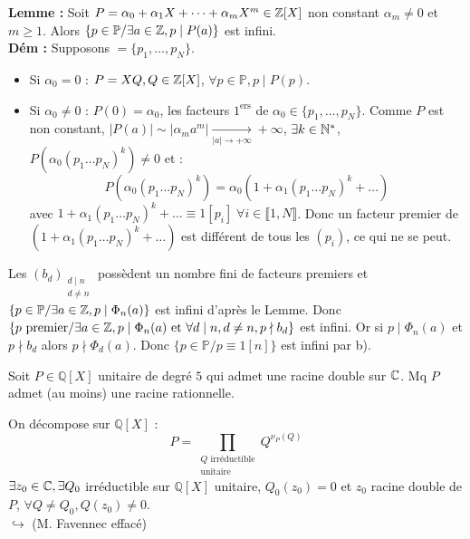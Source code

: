 \begin{solution}
\textbf{Lemme :} Soit $P = \alpha_0 + \alpha_1 X + \dots + \alpha_m X^m \in \mathbb Z[X]$ non constant $\alpha_m \neq 0$ et $m \geq 1$. Alors $\{p \in \mathbb{P} / \exists a \in \mathbb Z, p \mid P(a)\}$ est infini. \\
\textbf{Dém :} Supposons $= \{p_1, \dots, p_N\}$.
\begin{itemize}
  \item Si $\alpha_0 = 0$ : $P = X Q, Q \in \mathbb Z[X]$, $\forall p \in \mathbb{P}, p \mid P(p)$.
  \item Si $\alpha_0 \neq 0$ : $P(0) = \alpha_0$, les facteurs $1^{\text{ers}}$ de $\alpha_0 \in \{p_1, \dots, p_N\}$.
  Comme $P$ est non constant, $|P(a)| \sim |\alpha_m a^m| \xrightarrow[|a| \to +\infty]{} +\infty$, $\exists k \in \mathbb N^*$, $P(\alpha_0(p_1 \dots p_N)^k) \neq 0$ et :
  \[ P(\alpha_0(p_1 \dots p_N)^k) = \alpha_0 \left(1 + \alpha_1(p_1 \dots p_N)^k + \dots\right) \]
  avec $1 + \alpha_1(p_1 \dots p_N)^k + \dots \equiv 1 [p_i] \; \forall i \in \llbracket 1, N \rrbracket$.
  Donc un facteur premier de $(1 + \alpha_1(p_1 \dots p_N)^k + \dots)$ est différent de tous les $(p_i)$, ce qui ne se peut.
\end{itemize}

Les $(b_d)_{\substack{d \mid n \\ d \neq n}}$ possèdent un nombre fini de facteurs premiers et $\{p \in \mathbb{P} / \exists a \in \mathbb Z, p \mid \Phi_n(a)\}$ est infini d'après le Lemme.
Donc $\{p \text{ premier} / \exists a \in \mathbb Z, p \mid \Phi_n(a) \text{ et } \forall d \mid n, d \neq n, p \nmid b_d\}$ est infini.
Or si $p \mid \Phi_n(a)$ et $p \nmid b_d$ alors $p \nmid \Phi_d(a)$.
Donc $\{p \in \mathbb{P} / p \equiv 1 [n]\}$ est infini par b).
\end{solution}


\begin{statementbox}
Soit $P \in \mathbb{Q}[X]$ unitaire de degré $5$ qui admet une racine double sur $\mathbb C$. Mq $P$ admet (au moins) une racine rationnelle.
\end{statementbox}

\begin{solution}
On décompose sur $\mathbb{Q}[X]$ :
\[ P = \prod_{\substack{Q \text{ irréductible} \\ \text{unitaire}}} Q^{\nu_P(Q)} \]
$\exists z_0 \in \mathbb C, \exists Q_0$ irréductible sur $\mathbb{Q}[X]$ unitaire, $Q_0(z_0) = 0$ et $z_0$ racine double de $P$, $\forall Q \neq Q_0, Q(z_0) \neq 0$. \\
$\hookrightarrow$ (M. Favennec effacé)
\end{solution}

